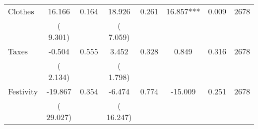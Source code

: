 \begin{tabular}{l*{7}{c}}
 Clothes       &             16.166       &        0.164  &             18.926       &        0.261  &             16.857***       &              0.009 &  2678 \\ 
                       &       (       9.301)             &                               &       (       7.059)                     &                               &                                               &                                &                      \\ 

 Taxes       &             -0.504       &        0.555  &              3.452       &        0.328  &              0.849       &              0.316 &  2678 \\ 
                       &       (       2.134)             &                               &       (       1.798)                     &                               &                                               &                                &                      \\ 

 Festivity       &            -19.867       &        0.354  &             -6.474       &        0.774  &            -15.009       &              0.251 &  2678 \\ 
                       &       (      29.027)             &                               &       (      16.247)                     &                               &                                               &                                &                      \\ 

\hline \end{tabular}